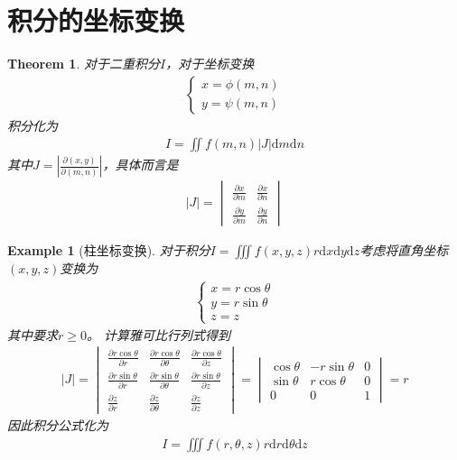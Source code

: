 \documentclass[12pt,a4paper,UTF8]{ctexbook}
\theoremstyle{plain}
\newtheorem{theorem}{\indent Theorem}[section]
\newtheorem{example}{\indent Example}[section]
\begin{document}
\section{积分的坐标变换}
\begin{theorem}
    对于二重积分$I$，对于坐标变换
    \begin{align*} 
        \left \{\begin{array}{lc}x=\phi(m,n)\\y=\psi(m,n)\end{array}\right.
    \end{align*}
    积分化为
    \begin{align*} 
        I=\iint f(m,n)|J|\mathrm dm \mathrm dn
    \end{align*}
    其中$J=|\frac{\partial(x,y)}{\partial(m,n)}|$，具体而言是
    \begin{align*} 
        |J|=\begin{vmatrix}\frac{\partial x}{\partial m}&\frac{\partial x}{\partial n}\\
            \frac{\partial y}{\partial m}&\frac{\partial y}{\partial n}\end{vmatrix}
    \end{align*}
\end{theorem}
\begin{example}[柱坐标变换]
    对于积分$I=\iiint f(x,y,z)r\mathrm d x\mathrm d y\mathrm d z$考虑将直角坐标$(x,y,z)$变换为
    \begin{align*} 
        \left \{\begin{array}{lc}x=r\cos \theta \\y=r\sin \theta \\ z=z\end{array}\right.
    \end{align*}
    其中要求$r\geq 0$。
    计算雅可比行列式得到
    \begin{align*} 
        |J|=\begin{vmatrix}\frac{\partial r\cos \theta}{\partial r}& \frac{\partial r\cos \theta}{\partial \theta}& \frac{\partial r\cos \theta}{\partial z}\\
            \frac{\partial r\sin \theta}{\partial r}&\frac{\partial r\sin \theta}{\partial \theta}&\frac{\partial r\sin \theta}{\partial z}\\
            \frac{\partial z }{\partial r}&\frac{\partial z }{\partial \theta}&\frac{\partial z}{\partial z}\end{vmatrix}
           =\begin{vmatrix}\cos \theta & -r\sin \theta & 0 \\ \sin \theta  & r\cos \theta & 0 \\
        0&0&1\end{vmatrix}=r
    \end{align*}
    因此积分公式化为
    \begin{align*} 
        I=\iiint f(r,\theta,z)r\mathrm d r\mathrm d \theta\mathrm d z
    \end{align*}
\end{example}
\end{document}
